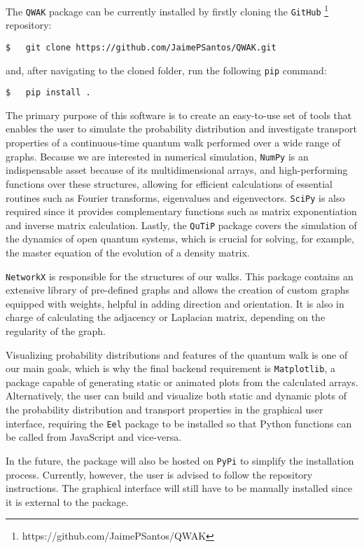 \documentclass[../../dissertation.tex]{subfiles}
\begin{document}
The \texttt{QWAK} package can be currently installed by firstly cloning the
\texttt{GitHub} \footnote{https://github.com/JaimePSantos/QWAK} repository:

\begin{lstlisting}[style=commands]
$   git clone https://github.com/JaimePSantos/QWAK.git 
\end{lstlisting}
and, after navigating to the cloned folder, run the following \texttt{pip}
command: 
\begin{lstlisting}[style=commands]
$   pip install .
\end{lstlisting}

The primary purpose of this software is to create an easy-to-use set of tools
that enables the user to simulate the probability distribution and investigate
transport properties of a continuous-time quantum walk performed over a wide
range of graphs. Because we are interested in numerical simulation,
\texttt{NumPy} is an indispensable asset because of its multidimensional
arrays, and high-performing functions over these structures, allowing for
efficient calculations of essential routines such as Fourier transforms,
eigenvalues and eigenvectors. \texttt{SciPy} is also required since it provides
complementary functions such as matrix exponentiation and inverse matrix
calculation. Lastly, the \texttt{QuTiP} package covers the simulation of the
dynamics of open quantum systems, which is crucial for solving, for example,
the master equation of the evolution of a density matrix.\par

\texttt{NetworkX} is responsible for the structures of our walks. This package
contains an extensive library of pre-defined graphs and allows the
creation of custom graphs equipped with weights, helpful in adding direction
and orientation. It is also in charge of calculating the adjacency or Laplacian
matrix, depending on the regularity of the graph.\par

Visualizing probability distributions and features of the quantum walk is one
of our main goals, which is why the final backend requirement is
\texttt{Matplotlib}, a package capable of generating static or animated plots
from the calculated arrays. Alternatively, the user can build and visualize
both static and dynamic plots of the probability distribution and transport
properties in the graphical user interface, requiring the \texttt{Eel} package
to be installed so that Python functions can be called from
JavaScript and vice-versa.\par

In the future, the package will also be hosted on \texttt{PyPi} to
simplify the installation process. Currently, however, the user is advised to
follow the repository instructions. The graphical interface will still have to
be manually installed since it is external to the package.
\end{document}
